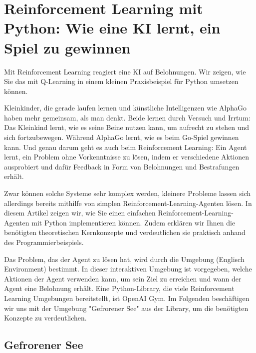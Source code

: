 %
%
%
%





\chapter{Reinforcement Learning mit Python: Wie eine KI lernt, ein Spiel zu gewinnen}

Mit Reinforcement Learning reagiert eine KI auf Belohnungen. Wir zeigen, wie Sie das mit Q-Learning in einem kleinen Praxisbeispiel für Python umsetzen können.

Kleinkinder, die gerade laufen lernen und künstliche Intelligenzen wie AlphaGo haben mehr gemeinsam, als man denkt. Beide lernen durch Versuch und Irrtum: Das Kleinkind lernt, wie es seine Beine nutzen kann, um aufrecht zu stehen und sich fortzubewegen. Während AlphaGo lernt, wie es beim Go-Spiel gewinnen kann. Und genau darum geht es auch beim Reinforcement Learning: Ein Agent lernt, ein Problem ohne Vorkenntnisse zu lösen, indem er verschiedene Aktionen ausprobiert und dafür Feedback in Form von Belohnungen und Bestrafungen erhält.

Zwar können solche Systeme sehr komplex werden, kleinere Probleme lassen sich allerdings bereits mithilfe von simplen Reinforcement-Learning-Agenten lösen. In diesem Artikel zeigen wir, wie Sie einen einfachen Reinforcement-Learning-Agenten mit Python implementieren können. Zudem erklären wir Ihnen die benötigten theoretischen Kernkonzepte und verdeutlichen sie praktisch anhand des Programmierbeispiels.

Das Problem, das der Agent zu lösen hat, wird durch die Umgebung (Englisch Environment) bestimmt. In dieser interaktiven Umgebung ist vorgegeben, welche Aktionen der Agent verwenden kann, um sein Ziel zu erreichen und wann der Agent eine Belohnung erhält. Eine Python-Library, die viele Reinforcement Learning Umgebungen bereitstellt, ist OpenAI Gym. Im Folgenden beschäftigen wir uns mit der Umgebung "Gefrorener See" aus der Library, um die benötigten Konzepte zu verdeutlichen.

\section{Gefrorener See}

